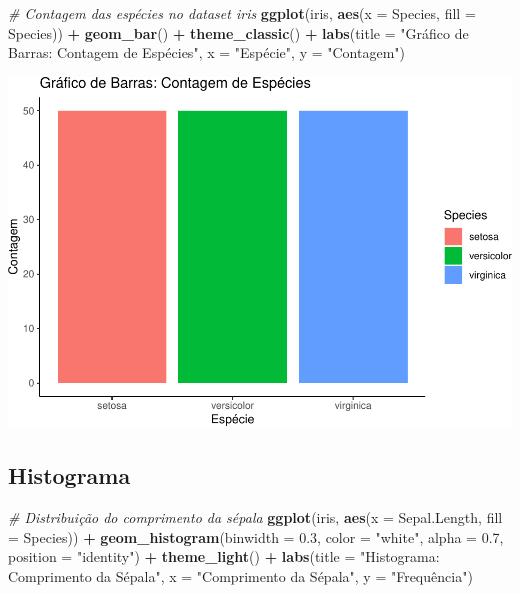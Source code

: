 \documentclass[
]{book}
\newenvironment{Shaded}{\begin{snugshade}}{\end{snugshade}}
\newcommand{\AttributeTok}[1]{\textcolor[rgb]{0.13,0.29,0.53}{#1}}
\newcommand{\CommentTok}[1]{\textcolor[rgb]{0.56,0.35,0.01}{\textit{#1}}}
\newcommand{\FloatTok}[1]{\textcolor[rgb]{0.00,0.00,0.81}{#1}}
\newcommand{\FunctionTok}[1]{\textcolor[rgb]{0.13,0.29,0.53}{\textbf{#1}}}
\newcommand{\NormalTok}[1]{#1}
\newcommand{\SpecialCharTok}[1]{\textcolor[rgb]{0.81,0.36,0.00}{\textbf{#1}}}
\newcommand{\StringTok}[1]{\textcolor[rgb]{0.31,0.60,0.02}{#1}}
\begin{document}
\begin{Shaded}
\begin{Highlighting}[]
\CommentTok{\# Contagem das espécies no dataset iris}
\FunctionTok{ggplot}\NormalTok{(iris, }\FunctionTok{aes}\NormalTok{(}\AttributeTok{x =}\NormalTok{ Species, }\AttributeTok{fill =}\NormalTok{ Species)) }\SpecialCharTok{+}
  \FunctionTok{geom\_bar}\NormalTok{() }\SpecialCharTok{+}
  \FunctionTok{theme\_classic}\NormalTok{() }\SpecialCharTok{+}
  \FunctionTok{labs}\NormalTok{(}\AttributeTok{title =} \StringTok{"Gráfico de Barras: Contagem de Espécies"}\NormalTok{,}
       \AttributeTok{x =} \StringTok{"Espécie"}\NormalTok{,}
       \AttributeTok{y =} \StringTok{"Contagem"}\NormalTok{)}
\end{Highlighting}
\end{Shaded}

\includegraphics{LivroEstatisticaR_files/figure-latex/ggbarIris-1.pdf}

\subsection{Histograma}\label{histograma-1}

\begin{Shaded}
\begin{Highlighting}[]
\CommentTok{\# Distribuição do comprimento da sépala}
\FunctionTok{ggplot}\NormalTok{(iris, }\FunctionTok{aes}\NormalTok{(}\AttributeTok{x =}\NormalTok{ Sepal.Length, }\AttributeTok{fill =}\NormalTok{ Species)) }\SpecialCharTok{+}
  \FunctionTok{geom\_histogram}\NormalTok{(}\AttributeTok{binwidth =} \FloatTok{0.3}\NormalTok{, }\AttributeTok{color =} \StringTok{"white"}\NormalTok{, }\AttributeTok{alpha =} \FloatTok{0.7}\NormalTok{, }\AttributeTok{position =} \StringTok{"identity"}\NormalTok{) }\SpecialCharTok{+}
  \FunctionTok{theme\_light}\NormalTok{() }\SpecialCharTok{+}
  \FunctionTok{labs}\NormalTok{(}\AttributeTok{title =} \StringTok{"Histograma: Comprimento da Sépala"}\NormalTok{,}
       \AttributeTok{x =} \StringTok{"Comprimento da Sépala"}\NormalTok{,}
       \AttributeTok{y =} \StringTok{"Frequência"}\NormalTok{)}
\end{Highlighting}
\end{Shaded}
\end{document}
